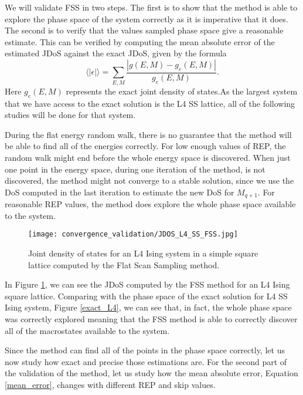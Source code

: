 	We will validate FSS in two steps. The first is to show that the method is able to explore the phase space of the system correctly as it is imperative that it does. The second is to verify that the values sampled phase space give a reasonable estimate. This can be verified by computing the mean absolute error of the estimated JDoS against the exact JDoS, given by the formula
\begin{equation}\label{mean_error}
	  \langle |\epsilon|\rangle = \sum_{E, M} \frac{|g(E, M) - g_e(E, M)|}{g_e(E, M)}.
\end{equation} 
Here $g_e(E, M)$ represents the exact joint density of states.As the largest system that we have access to the exact solution is the L4 SS lattice, all of the following studies will be done for that system.

	During the flat energy random walk, there is no guarantee that the method will  be able to find all of the energies correctly. For low enough values of REP, the random walk might end before the whole energy space is discovered. When just one point in the energy space, during one iteration of the method, is not discovered, the method might not converge to a stable solution, since we use the DoS computed in the last iteration to estimate the new DoS for $M_{q+1}$. For reasonable REP values, the method does explore the whole phase space available to the system.
\begin{figure}[h]
	\centering
	\texttt{[image: convergence\_validation/JDOS\_L4\_SS\_FSS.jpg]}
	\caption{Joint density of states for an L4 Ising system in a simple square lattice computed by the Flat Scan Sampling method. }
	\label{jdos_est}
\end{figure}	

\pagebreak
	
	In Figure \ref{jdos_est}, we can see the JDoS computed by the FSS method for an L4 Ising square lattice. Comparing with the phase space of the exact solution for L4 SS Ising system, Figure \ref{exact_L4}, we can see that, in fact, the whole phase space was correctly explored meaning that the FSS method is able to correctly discover all of the macrostates available to the system. 

	Since the method can find all of the points in the phase space correctly, let us now study how exact and precise those estimations are. For the second part of the validation of the method, let us study how the mean absolute error, Equation \ref{mean_error}, changes with different REP and skip values.

